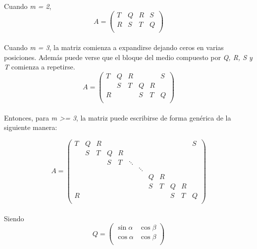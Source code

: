 \documentclass[a4paper,11pt]{article}
\begin{document}
\paragraph{}
Cuando \emph{m = 2},
\begin{equation} \label{matrizM2}
A =
\left( \begin{array}{cccc}
T & Q & R & S\\
R & S & T & Q\\
\end{array} \right)
\end{equation}
\paragraph{}
Cuando \emph{m = 3}, la matriz comienza a expandirse dejando ceros en varias posiciones. Adem\'as puede verse que el bloque del medio compuesto por \emph{Q, R, S y T} comienza a repetirse.
\begin{equation} \label{matrizM3}
A =
\left( \begin{array}{cccccc}
T & Q & R & & & S\\
 & S & T & Q & R & \\
R & & & S & T & Q\\
\end{array} \right)
\end{equation}
\paragraph{}
Entonces, para \emph{m \textgreater = 3}, la matriz puede escribirse de forma gen\'erica de la siguiente manera:

\begin{equation} \label{matrizM4}
A =
\left( \begin{array}{cccccccccccc}
T & Q & R &   &   &  &  &  &  &  &  & S\\
  & S & T & Q & R &  &  &  &  &  &  &  \\
  &   &   & S & T & \ddots&  &  &  &  &  &  \\
  &   &   &   &   &  & \ddots&  &  &  &  &  \\
  &   &   &   &   &  &  & Q & R &  &  &  \\
  &   &   &   &   &  &  & S & T & Q & R &  \\
R &   &   &   &   &  &  &   &   & S & T & Q\\
\end{array} \right)
\end{equation}
\paragraph{}
Siendo
\begin{equation} \label{matrizQ}
Q =
\left( \begin{array}{cccc}
\sin \alpha & \cos \beta\\
\cos \alpha & \cos \beta\\
\end{array} \right)
\end{equation}
\end{document}
